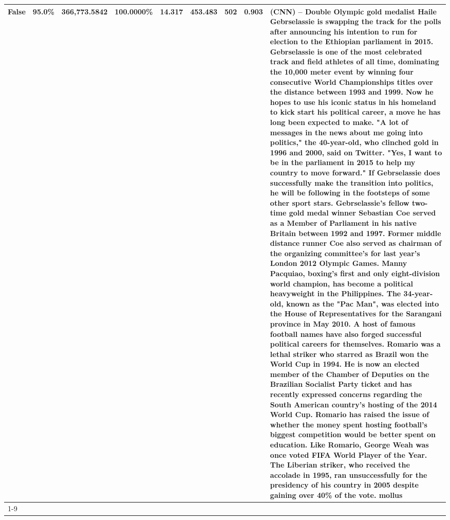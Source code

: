\begin{table}[H]
{\begin{tabular}{lllrlllll}
False & 95.0\% & 366,773.5842 & \bfseries \color{red} 100.0000\% & 14.317 & 453.483 & 502 & 0.903 & (CNN) -- Double Olympic gold medalist Haile Gebrselassie is swapping the track for the polls after announcing his intention to run for election to the Ethiopian parliament in 2015. Gebrselassie is one of the most celebrated track and field athletes of all time, dominating the 10,000 meter event by winning four consecutive World Championships titles over the distance between 1993 and 1999. Now he hopes to use his iconic status in his homeland to kick start his political career, a move he has long been expected to make. "A lot of messages in the news about me going into politics," the 40-year-old, who clinched gold in 1996 and 2000, said on Twitter. "Yes, I want to be in the parliament in 2015 to help my country to move forward." If Gebrselassie does successfully make the transition into politics, he will be following in the footsteps of some other sport stars. Gebrselassie's fellow two-time gold medal winner Sebastian Coe served as a Member of Parliament in his native Britain between 1992 and 1997. Former middle distance runner Coe also served as chairman of the organizing committee's for last year's London 2012 Olympic Games. Manny Pacquiao, boxing's first and only eight-division world champion, has become a political heavyweight in the Philippines. The 34-year-old, known as the "Pac Man", was elected into the House of Representatives for the Sarangani province in May 2010. A host of famous football names have also forged successful political careers for themselves. Romario was a lethal striker who starred as Brazil won the World Cup in 1994. He is now an elected member of the Chamber of Deputies on the Brazilian Socialist Party ticket and has recently expressed concerns regarding the South American country's hosting of the 2014 World Cup. Romario has raised the issue of whether the money spent hosting football's biggest competition would be better spent on education. Like Romario, George Weah was once voted FIFA World Player of the Year. The Liberian striker, who received the accolade in 1995, ran unsuccessfully for the presidency of his country in 2005 despite gaining over 40\% of the vote. mollus \\
\cline{1-9}

\end{tabular}}
\end{table}
